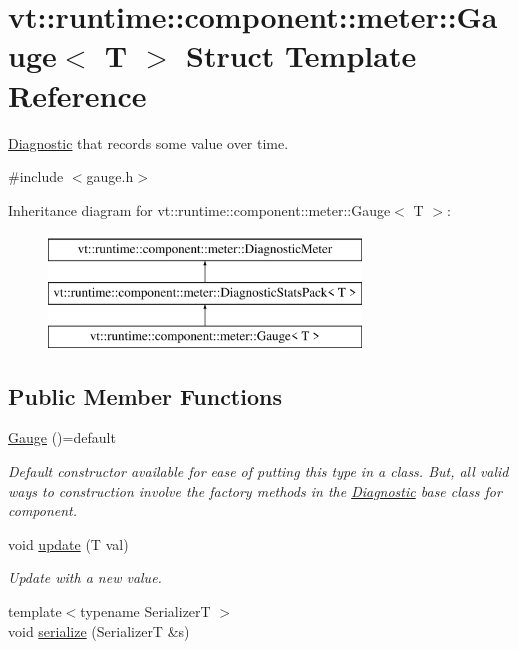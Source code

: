 \hypertarget{structvt_1_1runtime_1_1component_1_1meter_1_1_gauge}{}\section{vt\+:\+:runtime\+:\+:component\+:\+:meter\+:\+:Gauge$<$ T $>$ Struct Template Reference}
\label{structvt_1_1runtime_1_1component_1_1meter_1_1_gauge}


\hyperlink{structvt_1_1runtime_1_1component_1_1_diagnostic}{Diagnostic} that records some value over time.  




{\ttfamily \#include $<$gauge.\+h$>$}

Inheritance diagram for vt\+:\+:runtime\+:\+:component\+:\+:meter\+:\+:Gauge$<$ T $>$\+:\begin{figure}[H]
\begin{center}
\leavevmode
\includegraphics[height=3.000000cm]{structvt_1_1runtime_1_1component_1_1meter_1_1_gauge}
\end{center}
\end{figure}
\subsection*{Public Member Functions}
\begin{DoxyCompactItemize}
\item 
\hyperlink{structvt_1_1runtime_1_1component_1_1meter_1_1_gauge_a39b552111951ca991e92b7a3886e7d97}{Gauge} ()=default
\begin{DoxyCompactList}\small\item\em Default constructor available for ease of putting this type in a class. But, all valid ways to construction involve the factory methods in the {\ttfamily \hyperlink{structvt_1_1runtime_1_1component_1_1_diagnostic}{Diagnostic}} base class for component. \end{DoxyCompactList}\item 
void \hyperlink{structvt_1_1runtime_1_1component_1_1meter_1_1_gauge_a60af475569c49b999e8fbc4c80a788ce}{update} (T val)
\begin{DoxyCompactList}\small\item\em Update with a new value. \end{DoxyCompactList}\item 
{\footnotesize template$<$typename SerializerT $>$ }\\void \hyperlink{structvt_1_1runtime_1_1component_1_1meter_1_1_gauge_a5b4a65a1c46ee3d97e927dc6653d8d29}{serialize} (SerializerT \&s)
\end{DoxyCompactItemize}
